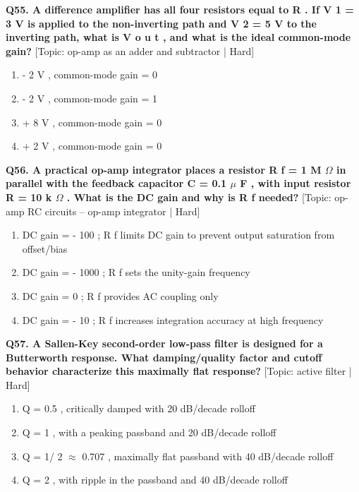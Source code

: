\noindent\textbf{Q55. A difference amplifier has all four resistors equal to R . If V 1 = 3 V is applied to the non-inverting path and V 2 = 5 V to the inverting path, what is V o u t , and what is the ideal common-mode gain?} \hfill [Topic: op-amp as an adder and subtractor | Hard]
\begin{enumerate}[label=(\alph*),topsep=2pt,itemsep=1pt,partopsep=0pt,parsep=0pt]
    \item {- 2 V , common-mode gain = 0}
    \item {- 2 V , common-mode gain = 1}
    \item {+ 8 V , common-mode gain = 0}
    \item {+ 2 V , common-mode gain = 0}
\end{enumerate}
\vspace{2mm}

\noindent\textbf{Q56. A practical op-amp integrator places a resistor R f = 1 M $\Omega$ in parallel with the feedback capacitor C = 0.1 $\mu$ F , with input resistor R = 10 k $\Omega$ . What is the DC gain and why is R f needed?} \hfill [Topic: op-amp RC circuits -- op-amp integrator | Hard]
\begin{enumerate}[label=(\alph*),topsep=2pt,itemsep=1pt,partopsep=0pt,parsep=0pt]
    \item {DC gain = - 100 ; R f limits DC gain to prevent output saturation from offset/bias}
    \item {DC gain = - 1000 ; R f sets the unity-gain frequency}
    \item {DC gain = 0 ; R f provides AC coupling only}
    \item {DC gain = - 10 ; R f increases integration accuracy at high frequency}
\end{enumerate}
\vspace{2mm}

\noindent\textbf{Q57. A Sallen-Key second-order low-pass filter is designed for a Butterworth response. What damping/quality factor and cutoff behavior characterize this maximally flat response?} \hfill [Topic: active filter | Hard]
\begin{enumerate}[label=(\alph*),topsep=2pt,itemsep=1pt,partopsep=0pt,parsep=0pt]
    \item {Q = 0.5 , critically damped with 20 dB/decade rolloff}
    \item {Q = 1 , with a peaking passband and 20 dB/decade rolloff}
    \item {Q = 1/ 2 $\approx$ 0.707 , maximally flat passband with 40 dB/decade rolloff}
    \item {Q = 2 , with ripple in the passband and 40 dB/decade rolloff}
\end{enumerate}
\vspace{2mm}

